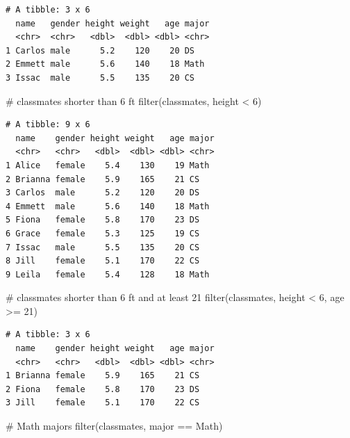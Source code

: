 \documentclass[
  letterpaper,
  DIV=11,
  numbers=noendperiod]{scrreprt}
\newenvironment{Shaded}{\begin{snugshade}}{\end{snugshade}}
\newcommand{\CommentTok}[1]{\textcolor[rgb]{0.37,0.37,0.37}{#1}}
\newcommand{\DecValTok}[1]{\textcolor[rgb]{0.68,0.00,0.00}{#1}}
\newcommand{\FunctionTok}[1]{\textcolor[rgb]{0.28,0.35,0.67}{#1}}
\newcommand{\NormalTok}[1]{\textcolor[rgb]{0.00,0.23,0.31}{#1}}
\newcommand{\SpecialCharTok}[1]{\textcolor[rgb]{0.37,0.37,0.37}{#1}}
\newcommand{\StringTok}[1]{\textcolor[rgb]{0.13,0.47,0.30}{#1}}
\begin{document}
\begin{tcolorbox}
\begin{verbatim}
# A tibble: 3 x 6
  name   gender height weight   age major
  <chr>  <chr>   <dbl>  <dbl> <dbl> <chr>
1 Carlos male      5.2    120    20 DS   
2 Emmett male      5.6    140    18 Math 
3 Issac  male      5.5    135    20 CS   
\end{verbatim}

\begin{Shaded}
\begin{Highlighting}[]
\CommentTok{\# classmates shorter than 6 ft}
\FunctionTok{filter}\NormalTok{(classmates, height }\SpecialCharTok{\textless{}} \DecValTok{6}\NormalTok{)}
\end{Highlighting}
\end{Shaded}

\begin{verbatim}
# A tibble: 9 x 6
  name    gender height weight   age major
  <chr>   <chr>   <dbl>  <dbl> <dbl> <chr>
1 Alice   female    5.4    130    19 Math 
2 Brianna female    5.9    165    21 CS   
3 Carlos  male      5.2    120    20 DS   
4 Emmett  male      5.6    140    18 Math 
5 Fiona   female    5.8    170    23 DS   
6 Grace   female    5.3    125    19 CS   
7 Issac   male      5.5    135    20 CS   
8 Jill    female    5.1    170    22 CS   
9 Leila   female    5.4    128    18 Math 
\end{verbatim}

\begin{Shaded}
\begin{Highlighting}[]
\CommentTok{\# classmates shorter than 6 ft and at least 21}
\FunctionTok{filter}\NormalTok{(classmates, height }\SpecialCharTok{\textless{}} \DecValTok{6}\NormalTok{, age }\SpecialCharTok{\textgreater{}=} \DecValTok{21}\NormalTok{)}
\end{Highlighting}
\end{Shaded}

\begin{verbatim}
# A tibble: 3 x 6
  name    gender height weight   age major
  <chr>   <chr>   <dbl>  <dbl> <dbl> <chr>
1 Brianna female    5.9    165    21 CS   
2 Fiona   female    5.8    170    23 DS   
3 Jill    female    5.1    170    22 CS   
\end{verbatim}

\begin{Shaded}
\begin{Highlighting}[]
\CommentTok{\# Math majors}
\FunctionTok{filter}\NormalTok{(classmates, major }\SpecialCharTok{==} \StringTok{\textquotesingle{}Math\textquotesingle{}}\NormalTok{)}
\end{Highlighting}
\end{Shaded}


\end{tcolorbox}
\end{document}
